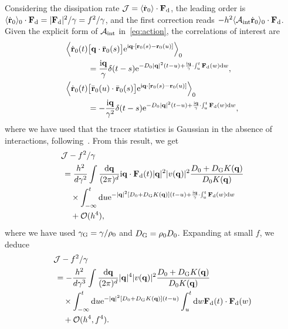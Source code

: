 \documentclass[pre, superscriptaddress, twocolumn,pre]{revtex4-1}
\begin{document}
Considering the dissipation rate ${\cal J}=\langle\dot{\bf r}_0\rangle\cdot{\bf F}_{\rm d}$, the leading order is $\langle\dot{\bf r}_0\rangle_0 \cdot {\bf F}_{\rm d} = |{\bf F}_{\rm d}|^2/\gamma = f^2/\gamma$, and the first correction reads $ - h^2 \langle{\cal A}_{\rm int}\dot{\bf r}_0\rangle_0 \cdot {\bf F}_{\rm d} $. Given the explicit form of ${\cal A}_{\rm int}$ in~\eqref{eq:action}, the correlations of interest are
\begin{equation}
	\begin{aligned}
		\Big\langle\dot{\bf r}_0(t) &\big[{\bf q}\cdot\bar{\bf r}_0(s)\big] {\rm e}^{{\rm i}{\bf q}\cdot[{\bf r}_0(s)-{\bf r}_0(u)]}\Big\rangle_0
		\\
		&= \frac{{\rm i}{\bf q}}{\gamma}\delta(t-s){\rm e}^{ - D_0|{\bf q}|^2(t-u) + \frac{{\rm i}{\bf q}}{\gamma}\cdot\int_u^t {\bf F}_{\rm d}(w) {\rm d}w} ,
		\\
		\Big\langle\dot{\bf r}_0(t) &\big[\bar{\bf r}_0(u)\cdot\bar{\bf r}_0(s)\big] {\rm e}^{{\rm i}{\bf q}\cdot[{\bf r}_0(s)-{\bf r}_0(u)]}\Big\rangle_0
		\\
		&= -\frac{{\rm i}{\bf q}}{\gamma^2}\delta(t-s){\rm e}^{ - D_0|{\bf q}|^2(t-u) + \frac{{\rm i}{\bf q}}{\gamma}\cdot\int_u^t {\bf F}_{\rm d}(w) {\rm d}w} ,
	\end{aligned}
\end{equation}
where we have used that the tracer statistics is Gaussian in the absence of interactions, following~\cite{Demery2011, Demery2014}. From this result, we get
\begin{equation}
	\begin{aligned}
		&{\cal J} - f^2/\gamma
		\\
		&\,= \frac{h^2}{d\gamma^2} \int \frac{{\rm d}{\bf q}}{(2\pi)^d} {\rm i}{\bf q}\cdot{\bf F}_{\rm d}(t) |{\bf q}|^2 |v({\bf q})|^2 \frac{D_0+D_{\rm G}K({\bf q})}{D_0K({\bf q})}
		\\
		&\,\quad\times \int_{-\infty}^t {\rm d}u {\rm e}^{-|{\bf q}|^2 [D_0+D_{\rm G} K({\bf q})](t-u) + \frac{{\rm i}{\bf q}}{\gamma}\cdot\int_u^t{\bf F}_{\rm d}(w){\rm d}w}
		\\
		&\,\quad + {\cal O}(h^4) ,
	\end{aligned}
\end{equation}
where we have used $\gamma_{\rm G}=\gamma/\rho_0$ and $D_{\rm G}=\rho_0D_0$. Expanding at small $f$, we deduce
\begin{equation}
	\begin{aligned}
		&{\cal J} - f^2/\gamma
		\\
		&\,= - \frac{h^2}{d\gamma^3} \int \frac{{\rm d}{\bf q}}{(2\pi)^d} |{\bf q}|^4 |v({\bf q})|^2 \frac{D_0+D_{\rm G}K({\bf q})}{D_0K({\bf q})}
		\\
		&\,\quad\times \int_{-\infty}^t {\rm d}u {\rm e}^{-|{\bf q}|^2 [D_0+D_{\rm G} K({\bf q})](t-u)} \int_u^t{\rm d}w{\bf F}_{\rm d}(t)\cdot{\bf F}_{\rm d}(w)
		\\
		&\,\quad + {\cal O}(h^4,f^4) .
	\end{aligned}
\end{equation}
\end{document}
